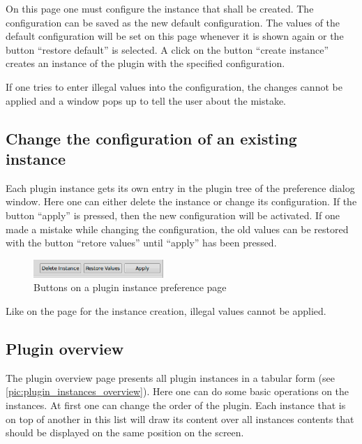 On this page one must configure the instance that shall be created. The configuration can be saved as the new default
configuration. The values of the default configuration will be set on this page whenever it is shown again or the button
``restore default'' is selected. A click on the button ``create instance'' creates an instance of the plugin with the
specified configuration.

If one tries to enter illegal values into the configuration, the changes cannot be applied and a window pops up to tell the
user about the mistake.

\subsection{Change the configuration of an existing instance}

Each plugin instance gets its own entry in the plugin tree of the preference dialog window. Here one can either delete
the instance or change its configuration. If the button ``apply'' is pressed, then the new configuration will be
activated. If one made a mistake while changing the configuration, the old values can be restored with the button
``retore values'' until ``apply'' has been pressed.

\begin{figure}[htb]
  \begin{center}
    \includegraphics[width=5cm]{./pics/buttons_instance_configuration}
    \caption{Buttons on a plugin instance preference page}
    \label{pic:buttons_instance_configuration}
  \end{center}
\end{figure}

Like on the page for the instance creation, illegal values cannot be applied.


\subsection{Plugin overview}
\label{subsection:pluginoverview}

The plugin overview page presents all plugin instances in a tabular form (see \ref{pic:plugin_instances_overview}).
Here one can do some basic operations
on the instances. At first one can change the order of the plugin. Each instance that is on top of another in this list will
draw its content over all instances contents that should be displayed on the same position on the screen.

